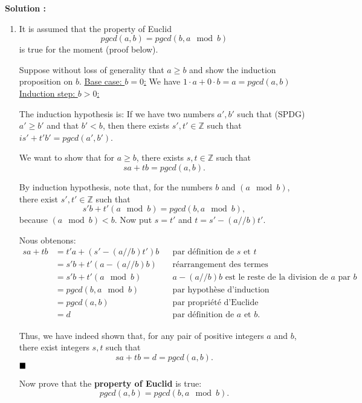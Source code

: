 \documentclass[11pt]{article} %
\newenvironment{solution}[1][\unskip]{%
	\par
	\noindent
	\textbf{Solution #1:}
	\noindent}
{\medskip}
\begin{document}
	\begin{solution}

		\begin{enumerate}
			\item {It is assumed that the property of Euclid
				$$ pgcd (a, b) = pgcd (b, a \mod b) $$
				is true for the moment (proof below).

				Suppose without loss of generality that $ a \geq b $ and show the induction proposition on $ b $. \underline {Base case: $ b = 0 $:} We have $ 1 \cdot a + 0 \cdot b = a = pgcd (a, b) $ \underline {Induction step: $ b> 0 $:}

				The induction hypothesis is: If we have two numbers $ a ', b' $ such that (SPDG) $ a '\geq b' $ and that $ b '<b $, then there exists $ s' , t '\in \mathbb {Z} $ such that $ is' + t'b' = pgcd (a ', b') $.

				We want to show that for $ a \geq b $, there exists $ s, t \in \mathbb {Z} $ such that $$ sa + tb = pgcd (a, b). $$

				By induction hypothesis, note that, for the numbers $ b $ and $ (a \mod b) $, there exist $ s ', t' \in \mathbb {Z} $ such that $$ s'b + t '(a \mod 	b) = pgcd (b, a \mod b), $$
				because $ (a \mod b) <b $. Now put $ s = t '$ and $ t = s' - (a // b) t' $.

				Nous obtenons:
				\begin{align*}
				sa+tb&=t'a + (s'-(a // b)t')b &&\text{par définition de $s$ et $t$}\\
				&=s'b + t' (a-(a // b)b)&&\text{réarrangement des termes}\\
				&=s'b + t'(a\mod b)&&\text{$a-(a // b)b$ est le reste de la division de $a$ par $b$}\\
				&= pgcd(b, a\mod b) &&\text{par hypothèse d'induction}\\
				&= pgcd(a, b) &&\text{par propriété d'Euclide}\\
				&=d &&\text{par définition de $a$ et $b$}.
				\end{align*}}


			Thus, we have indeed shown that, for any pair of positive integers $ a $ and $ b $, there exist integers $ s, t $ such that $$ sa + tb = d = pgcd (a, b) . $$ $ \hfill \blacksquare $

			Now prove that the \textbf {property of Euclid} is true:
			$$ pgcd (a, b) = pgcd (b, a \mod b). $$


\end{enumerate}
\end{solution}
\end{document}
